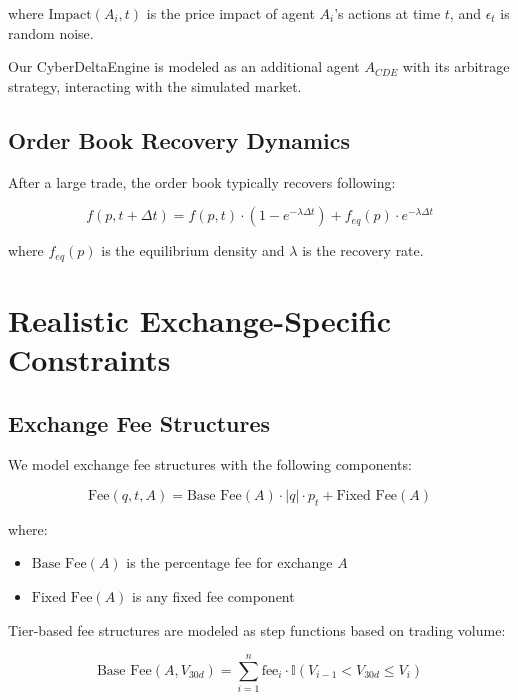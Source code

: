 \documentclass{article}
\begin{document}
where $\text{Impact}(A_i, t)$ is the price impact of agent $A_i$'s actions at time $t$, and $\epsilon_t$ is random noise.

Our CyberDeltaEngine is modeled as an additional agent $A_{CDE}$ with its arbitrage strategy, interacting with the simulated market.

\subsection{Order Book Recovery Dynamics}

After a large trade, the order book typically recovers following:

\begin{equation}
f(p, t + \Delta t) = f(p, t) \cdot (1 - e^{-\lambda \Delta t}) + f_{eq}(p) \cdot e^{-\lambda \Delta t}
\end{equation}

where $f_{eq}(p)$ is the equilibrium density and $\lambda$ is the recovery rate.

\section{Realistic Exchange-Specific Constraints}

\subsection{Exchange Fee Structures}

We model exchange fee structures with the following components:

\begin{equation}
\text{Fee}(q, t, A) = \text{Base Fee}(A) \cdot |q| \cdot p_t + \text{Fixed Fee}(A)
\end{equation}

where:
\begin{itemize}
    \item $\text{Base Fee}(A)$ is the percentage fee for exchange $A$
    \item $\text{Fixed Fee}(A)$ is any fixed fee component
\end{itemize}

Tier-based fee structures are modeled as step functions based on trading volume:

\begin{equation}
\text{Base Fee}(A, V_{30d}) = \sum_{i=1}^{n} \text{fee}_i \cdot \mathbb{I}(V_{i-1} < V_{30d} \leq V_i)
\end{equation}
\end{document}
